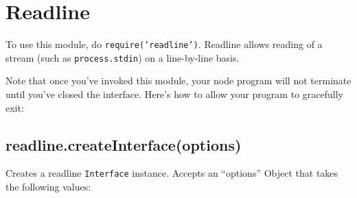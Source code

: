 \section{Readline}\label{readline}

\begin{Shaded}
\begin{Highlighting}[]
 
\end{Highlighting}
\end{Shaded}

To use this module, do \texttt{require('readline')}. Readline allows
reading of a stream (such as \texttt{process.stdin}) on a line-by-line
basis.

Note that once you've invoked this module, your node program will not
terminate until you've closed the interface. Here's how to allow your
program to gracefully exit:

\begin{Shaded}
\begin{Highlighting}[]
 \NormalTok{(}\NormalTok{);}

 \NormalTok{(\{}
  \NormalTok{: }\NormalTok{,}
  \NormalTok{: }
\NormalTok{\});}

\NormalTok{(}\NormalTok{, }
  \NormalTok{(}

  \NormalTok{();}
\NormalTok{\});}
\end{Highlighting}
\end{Shaded}

\subsection{readline.createInterface(options)}\label{readline.createinterfaceoptions}

Creates a readline \texttt{Interface} instance. Accepts an ``options''
Object that takes the following values:

